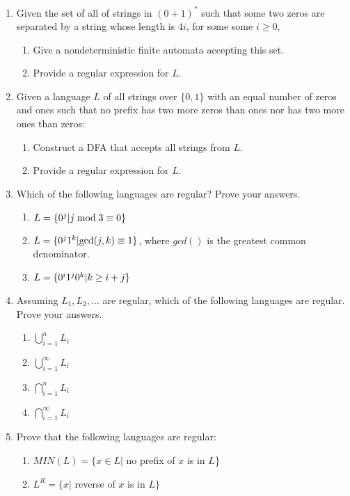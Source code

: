 \documentclass{article}%
\begin{document}
\begin{enumerate}

	\item Given the set of all of strings in $(0+1)^*$ such that some two zeros are separated by a string whose length is $4i$, for some some $i \geq 0$,
		\begin{enumerate}
		\item Give a nondeterministic finite automata accepting this set.
		\item Provide a regular expression for $L$.
	\end{enumerate}

	\item Given a language $L$ of all strings over $\{0,1\}$ with an equal number of zeros and ones such that no prefix has two more zeros than ones nor has two more ones than zeros:	
	\begin{enumerate}
		\item  Construct a DFA that accepts all strings from $L$.
		\item  Provide a regular expression for $L$.
	\end{enumerate}

	\item Which of the following languages are regular? Prove your answers.	
	\begin{enumerate}
		\item  $L = \{ 0^j |{\rm{ }}j\bmod 3 \equiv 0\}$
		\item  $L = \{ 0^j 1^k |{\rm{ gcd(}}j,k) \equiv 1\}$, where $gcd()$ is the greatest common denominator.
		\item  $L = \{ 0^i 1^j 0^k |{\rm{ }}k \ge i + j\} $
	\end{enumerate}

	\item Assuming $L_1 ,L_2 ,...$ are regular, which of the following languages are regular. Prove your answers.	
	\begin{enumerate}
		\item  $\bigcup\limits_{i = 1}^n {L_i } $
		\item  $\bigcup\limits_{i = 1}^\infty  {L_i } $
	  \item  $\bigcap\limits_{i = 1}^n {L_i } $
		\item  $\bigcap\limits_{i = 1}^\infty  {L_i } $
	\end{enumerate}


	\item Prove that the following languages are regular:
	\begin{enumerate}
	\item  $MIN(L) = \{ x \in L |$ no prefix of $x$ is in $L$\}
	\item  $L^R  = \{ x|$ reverse of $x$ is in $L\}$
	\end{enumerate}

	
\end{enumerate}
\end{document}
